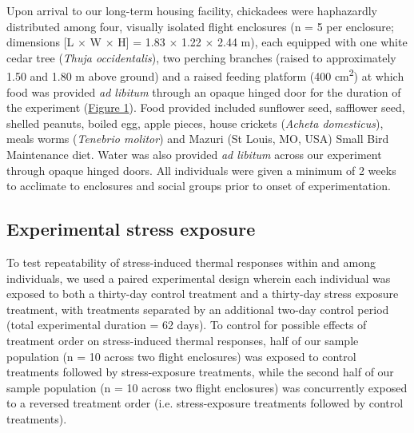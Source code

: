 \documentclass[12pt]{article}
\begin{document}
\noindent Upon arrival to our long-term housing facility, chickadees were haphazardly distributed among four, visually isolated flight enclosures (n = 5 per enclosure; dimensions [L $\times$ W $\times$ H] = 1.83 $\times$ 1.22 $\times$ 2.44 m), each equipped with one white cedar tree (\textit{Thuja occidentalis}), two perching branches (raised to approximately 1.50 and 1.80 m above ground) and a raised feeding platform (400 cm\textsuperscript{2}) at which food was provided \textit{ad libitum} through an opaque hinged door for the duration of the experiment (\hyperref[Fig4.1]{Figure 1}). Food provided included sunflower seed, safflower seed, shelled peanuts, boiled egg, apple pieces, house crickets (\textit{Acheta domesticus}), meals worms (\textit{Tenebrio molitor}) and Mazuri (St Louis, MO, USA) Small Bird Maintenance diet. Water was also provided \textit{ad libitum} across our experiment through opaque hinged doors. All individuals were given a minimum of 2 weeks to acclimate to enclosures and social groups prior to onset of experimentation. \vspace{0.5cm}

\subsection{Experimental stress exposure}
\vspace{0.5cm}

\noindent To test repeatability of stress-induced thermal responses within and among individuals, we used a paired experimental design wherein each individual was exposed to both a thirty-day control treatment and a thirty-day stress exposure treatment, with treatments separated by an additional two-day control period (total experimental duration = 62 days). To control for possible effects of treatment order on stress-induced thermal responses, half of our sample population (n = 10 across two flight enclosures) was exposed to control treatments followed by stress-exposure treatments, while the second half of our sample population (n = 10 across two flight enclosures) was concurrently exposed to a reversed treatment order (i.e. stress-exposure treatments followed by control treatments). \vspace{1cm} 
\end{document}
